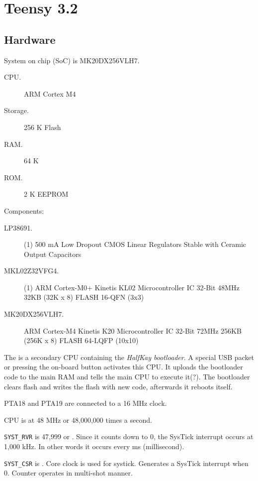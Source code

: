 \chapter{Teensy 3.2}

\section{Hardware}

System on chip (SoC) is MK20DX256VLH7.

\begin{description}
  \item[CPU.] ARM Cortex M4
  \item[Storage.] 256 K Flash
  \item[RAM.] 64 K
  \item[ROM.] 2 K EEPROM
\end{description}

Components:

\begin{description}
  \item[LP38691.] (1) 500 mA Low Dropout CMOS Linear Regulators Stable with
                  Ceramic Output Capacitors
  \item[MKL02Z32VFG4.] (1) ARM Cortex-M0+ Kinetis KL02 Microcontroller IC 32-Bit
                       48MHz 32KB (32K x 8) FLASH 16-QFN (3x3)
  \item[MK20DX256VLH7.] ARM Cortex-M4 Kinetis K20 Microcontroller IC 32-Bit
                        72MHz 256KB (256K x 8) FLASH 64-LQFP
                        (10x10)
\end{description}

The is a secondary CPU containing the \textit{HalfKay bootloader}.
A special USB packet or pressing the on-board button activates this CPU.
It uploads the bootloader code to the main RAM and tells the main CPU to
execute it(?).
The bootloader clears flash and writes the flash with new code, afterwards it
reboots itself.

PTA18 and PTA19 are connected to a 16 MHz clock.

CPU is at 48 MHz or 48,000,000 times a second.

\texttt{SYST\_RVR} is 47,999 or .
Since it counts down to 0, the SysTick interrupt occurs at 1,000 kHz.
In other words it occurs every ms (millisecond).

\texttt{SYST\_CSR} is .
Core clock is used for systick.
Generates a SysTick interrupt when 0.
Counter operates in multi-shot manner.

